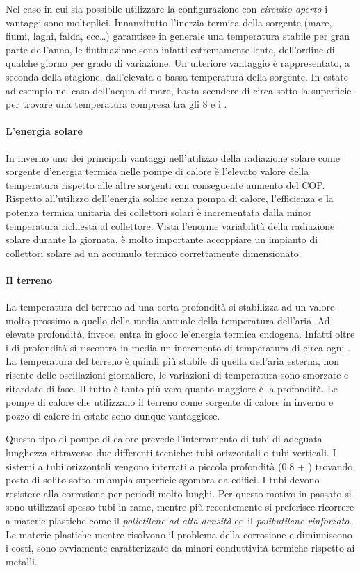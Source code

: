 Nel caso in cui sia possibile utilizzare la configurazione con \emph{circuito aperto} i vantaggi sono molteplici. Innanzitutto l'inerzia termica della sorgente (mare, fiumi, laghi, falda, ecc\dots) garantisce in generale una temperatura stabile per gran parte dell'anno, le fluttuazione sono infatti estremamente lente, dell'ordine di qualche giorno per grado di variazione. Un ulteriore vantaggio è rappresentato, a seconda della stagione, dall'elevata o bassa temperatura della sorgente. In estate ad esempio nel caso dell'acqua di mare, basta scendere di circa  sotto la superficie per trovare una temperatura compresa tra gli \num{8} e i .

\paragraph{L'energia solare}
In inverno uno dei principali vantaggi nell'utilizzo della radiazione solare come sorgente d'energia termica nelle pompe di calore è l'elevato valore della temperatura rispetto alle altre sorgenti con conseguente aumento del COP. Rispetto all'utilizzo dell'energia solare senza pompa di calore, l'efficienza e la potenza termica unitaria dei collettori solari è incrementata dalla minor temperatura richiesta al collettore. Vista l'enorme variabilità della radiazione solare durante la giornata, è molto importante accoppiare un impianto di collettori solare ad un accumulo termico correttamente dimensionato.

\paragraph{Il terreno}
La temperatura del terreno ad una certa profondità si stabilizza ad un valore molto prossimo a quello della media annuale della temperatura dell'aria. Ad elevate profondità, invece, entra in gioco le'energia termica endogena. Infatti oltre i  di profondità si riscontra in media un incremento di temperatura di circa  ogni . La temperatura del terreno è quindi più stabile di quella dell'aria esterna, non risente delle oscillazioni giornaliere, le variazioni di temperatura sono smorzate e ritardate di fase. Il tutto è tanto più vero quanto maggiore è la profondità. Le pompe di calore che utilizzano il terreno come sorgente di calore in inverno e pozzo di calore in estate sono dunque vantaggiose.

Questo tipo di pompe di calore prevede l'interramento di tubi di adeguata lunghezza attraverso due differenti tecniche: tubi orizzontali o tubi verticali. I sistemi a tubi orizzontali vengono interrati a piccola profondità (\num{0.8} + ) trovando posto di solito sotto un'ampia superficie sgombra da edifici. I tubi devono resistere alla corrosione per periodi molto lunghi. Per questo motivo in passato si sono utilizzati spesso tubi in rame, mentre più recentemente si preferisce ricorrere a materie plastiche come il \emph{polietilene ad alta densità} ed il \emph{polibutilene rinforzato}. Le materie plastiche mentre risolvono il problema della corrosione e diminuiscono i costi, sono ovviamente caratterizzate da minori conduttività termiche rispetto ai metalli.

